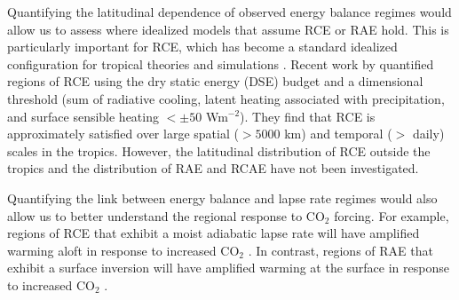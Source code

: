 \documentclass{ametsocV5}
\begin{document}
Quantifying the latitudinal dependence of observed energy balance regimes would allow us to assess where idealized models that assume RCE or RAE hold. This is particularly important for RCE, which has become a standard idealized configuration for tropical theories \citep[e.g.,][]{emanuel1996,nilsson1999,romps2014,singh2015} and simulations \citep[][and the references therein]{wing2018}. Recent work by \cite{jakob2019} quantified regions of RCE using the dry static energy (DSE) budget and a dimensional threshold (sum of radiative cooling, latent heating associated with precipitation, and surface sensible heating $< \pm 50$ Wm$^{-2}$). They find that RCE is approximately satisfied over large spatial ($>5000$ km) and temporal ($>$ daily) scales in the tropics. However, the latitudinal distribution of RCE outside the tropics and the distribution of RAE and RCAE have not been investigated.
  
Quantifying the link between energy balance and lapse rate regimes would also allow us to better understand the regional response to CO$_2$ forcing. For example, regions of RCE that exhibit a moist adiabatic lapse rate will have amplified warming aloft in response to increased CO$_2$ \citep{held1993, romps2011}. In contrast, regions of RAE that exhibit a surface inversion will have amplified warming at the surface in response to increased CO$_2$ \citep{held1993, cronin2016}.
\end{document}
